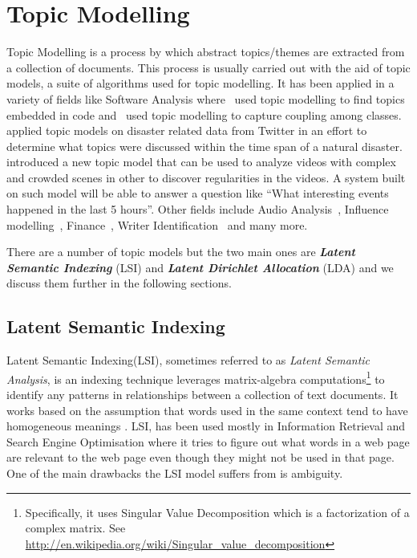 \section{Topic Modelling}
\label{sec:bg_topic_modelling}
Topic Modelling is a process by which abstract topics/themes are extracted from a collection of
documents. This process is usually carried out with the aid of topic models, a suite of algorithms
used for topic modelling. It has been applied in a variety of fields like Software Analysis
where~\cite{linstead2009software} used topic modelling to find topics embedded in code
and~\cite{gethers2010using} used topic modelling to capture coupling among
classes.~\cite{kireyev2009applications} applied topic models on disaster related data from Twitter
in an effort to determine what topics were discussed within the time span of a natural
disaster.~\cite{hospedales2009markov} introduced a new topic model that can be used to analyze
videos with complex and crowded scenes in other to discover regularities in the videos. A system
built on such model will be able to answer a question like ``What interesting events happened in the
last 5 hours''. Other fields include Audio Analysis~\cite{smaragdis2009topic}, Influence
modelling~\cite{gerrish2009modeling}, Finance~\cite{doyle2009financial}, Writer
Identification~\cite{bhardwaj2009writer} and many more.

There are a number of topic models but the two main ones are \textbf{\textit{Latent Semantic
Indexing}} (LSI) and \textbf{\textit{Latent Dirichlet Allocation}} (LDA) and we discuss them further
in the following sections.


\subsection{Latent Semantic Indexing}
\label{sub:bg_lsa}
Latent Semantic Indexing(LSI), sometimes referred to as \textit{Latent Semantic Analysis}, is an
indexing technique leverages matrix-algebra computations\footnote{Specifically, it uses Singular
Value Decomposition which is a factorization of a complex matrix. See
\url{http://en.wikipedia.org/wiki/Singular_value_decomposition}} to identify any patterns in
relationships between a collection of text documents. It works based on the assumption that words
used in the same context tend to have homogeneous meanings
\cite{deerwester1990indexing,dumais2004latent,landauer2006latent}. LSI, has been used mostly in
Information Retrieval and Search Engine Optimisation where it tries to figure out what words in a
web page are relevant to the web page even though they might not be used in that page. One of the
main drawbacks the LSI model suffers from is ambiguity.

